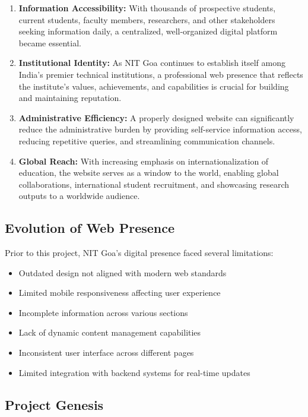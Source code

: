 \documentclass[12pt,a4paper]{report}
\begin{document}
\begin{enumerate}
    \item \textbf{Information Accessibility:} With thousands of prospective students, current students, faculty members, researchers, and other stakeholders seeking information daily, a centralized, well-organized digital platform became essential.

    \item \textbf{Institutional Identity:} As NIT Goa continues to establish itself among India's premier technical institutions, a professional web presence that reflects the institute's values, achievements, and capabilities is crucial for building and maintaining reputation.

    \item \textbf{Administrative Efficiency:} A properly designed website can significantly reduce the administrative burden by providing self-service information access, reducing repetitive queries, and streamlining communication channels.

    \item \textbf{Global Reach:} With increasing emphasis on internationalization of education, the website serves as a window to the world, enabling global collaborations, international student recruitment, and showcasing research outputs to a worldwide audience.
\end{enumerate}

\subsection*{Evolution of Web Presence}

Prior to this project, NIT Goa's digital presence faced several limitations:
\begin{itemize}
    \item Outdated design not aligned with modern web standards
    \item Limited mobile responsiveness affecting user experience
    \item Incomplete information across various sections
    \item Lack of dynamic content management capabilities
    \item Inconsistent user interface across different pages
    \item Limited integration with backend systems for real-time updates
\end{itemize}

\subsection*{Project Genesis}
\end{document}
